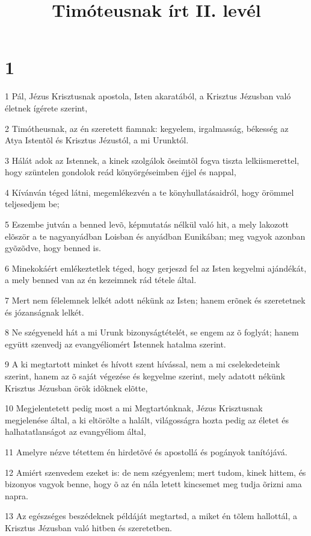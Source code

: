 

\title{Timóteusnak írt II. levél}


\chapter{1}

\par 1 Pál, Jézus Krisztusnak apostola, Isten akaratából, a Krisztus Jézusban való életnek ígérete szerint,
\par 2 Timótheusnak, az én szeretett fiamnak: kegyelem, irgalmasság, békesség az Atya Istentõl és Krisztus Jézustól, a mi Urunktól.
\par 3 Hálát adok az Istennek, a kinek szolgálok õseimtõl fogva tiszta lelkiismerettel, hogy szüntelen gondolok reád könyörgéseimben éjjel és nappal,
\par 4 Kívánván téged látni, megemlékezvén a te könyhullatásaidról, hogy örömmel teljesedjem be;
\par 5 Eszembe jutván a benned levõ, képmutatás nélkül való hit, a mely lakozott elõször a te nagyanyádban Loisban és anyádban Eunikában; meg vagyok azonban gyõzõdve, hogy benned is.
\par 6 Minekokáért emlékeztetlek téged, hogy gerjeszd fel az Isten kegyelmi ajándékát, a mely benned van az én kezeimnek rád tétele által.
\par 7 Mert nem félelemnek lelkét adott nékünk az Isten; hanem erõnek és szeretetnek és józanságnak lelkét.
\par 8 Ne szégyeneld hát a mi Urunk bizonyságtételét, se engem az õ foglyát; hanem együtt szenvedj az evangyéliomért Istennek hatalma szerint.
\par 9 A ki megtartott minket és hívott szent hívással, nem a mi cselekedeteink szerint, hanem az õ saját végezése és kegyelme szerint, mely adatott nékünk Krisztus Jézusban örök idõknek elõtte,
\par 10 Megjelentetett pedig most a mi Megtartónknak, Jézus Krisztusnak megjelenése által, a ki eltörölte a halált,  világosságra hozta pedig az életet és halhatatlanságot az evangyéliom által,
\par 11 Amelyre nézve tétettem én hirdetõvé és apostollá és pogányok tanítójává.
\par 12 Amiért szenvedem ezeket is: de nem szégyenlem; mert tudom, kinek hittem, és bizonyos vagyok benne, hogy õ az én nála letett kincsemet meg tudja õrizni ama napra.
\par 13 Az egészséges beszédeknek példáját megtartsd, a miket én tõlem hallottál, a Krisztus Jézusban való hitben és szeretetben.
